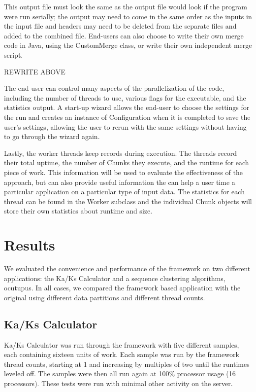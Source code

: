\documentclass[12pt]{article}
\begin{document}
This output
file must look the same as the output file would look if the program were run
serially; the output may need to come in the same order as the inputs in the
input file and headers may need to be deleted from the separate files and added
to the combined file. End-users can also choose to write their own merge code in
Java, using the CustomMerge class, or write their own independent merge script. 

REWRITE ABOVE

The end-user can control many aspects of the parallelization of the code,
including the number of threads to use, various flags for the executable, and the
statistics output.  A start-up wizard allows the end-user to choose the settings
for the run and creates an instance of Configuration when it is completed to
save the user's settings, allowing the user to rerun with the same settings
without having to go through the wizard again.

Lastly, the worker threads keep records during execution. The threads record
their total uptime, the number of Chunks they execute, and the runtime for
each piece of work. This information will be used to evaluate the effectiveness
of the approach, but can also provide useful information the can help a user
time a particular application on a particular type of input data. The statistics
for each thread can be found in the Worker subclass and the individual Chunk
objects will store their own statistics about runtime and size.

\section{Results}

We evaluated the convenience and performance of the framework on two different
applications: the Ka/Ks Calculator and a sequence clustering algorithms,
ocutupus. In all cases, we compared the framework based application with the
original using different data partitions and different thread counts.

\subsection{Ka/Ks Calculator}
Ka/Ks Calculator was run through the framework with five different samples, each
containing sixteen units of work. Each sample was run by the framework thread
counts, starting at 1 and increasing by multiples of two until the runtimes
leveled off. The samples were then all run again at 100\% processor usage (16
processors). These tests were run with minimal other activity on the server.
\end{document}

